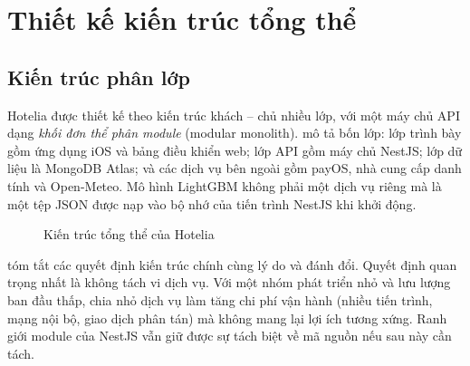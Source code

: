 \section{Thiết kế kiến trúc tổng thể}\label{sec:arch}

\subsection{Kiến trúc phân lớp}

Hotelia được thiết kế theo kiến trúc khách -- chủ nhiều lớp, với một máy chủ API dạng \emph{khối đơn thể phân module} (modular monolith).  mô tả bốn lớp: lớp trình bày gồm ứng dụng iOS và bảng điều khiển web; lớp API gồm máy chủ NestJS; lớp dữ liệu là MongoDB Atlas; và các dịch vụ bên ngoài gồm payOS, nhà cung cấp danh tính và Open-Meteo. Mô hình LightGBM không phải một dịch vụ riêng mà là một tệp JSON được nạp vào bộ nhớ của tiến trình NestJS khi khởi động.

\begin{figure}[H]
\centering
{}
\caption{Kiến trúc tổng thể của Hotelia}\label{fig:arch}
\end{figure}

 tóm tắt các quyết định kiến trúc chính cùng lý do và đánh đổi. Quyết định quan trọng nhất là không tách vi dịch vụ. Với một nhóm phát triển nhỏ và lưu lượng ban đầu thấp, chia nhỏ dịch vụ làm tăng chi phí vận hành (nhiều tiến trình, mạng nội bộ, giao dịch phân tán) mà không mang lại lợi ích tương xứng. Ranh giới module của NestJS vẫn giữ được sự tách biệt về mã nguồn nếu sau này cần tách.

